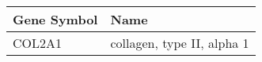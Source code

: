 \begin{tabular}{ll}
\toprule
Gene Symbol &                       Name \\
\midrule
     COL2A1 & collagen, type II, alpha 1 \\
\bottomrule
\end{tabular}
